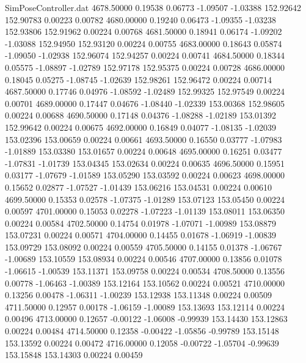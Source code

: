 \begin{filecontents}{SimPoseController.dat}
4678.50000    0.19538    0.06773    -1.09507   -1.03388  152.92642  152.90783    0.00223    0.00782
4680.00000    0.19240    0.06473    -1.09355   -1.03238  152.93806  152.91962    0.00224    0.00768
4681.50000    0.18941    0.06174    -1.09202   -1.03088  152.94950  152.93120    0.00224    0.00755
4683.00000    0.18643    0.05874    -1.09050   -1.02938  152.96074  152.94257    0.00224    0.00741
4684.50000    0.18344    0.05575    -1.08897   -1.02789  152.97178  152.95375    0.00224    0.00728
4686.00000    0.18045    0.05275    -1.08745   -1.02639  152.98261  152.96472    0.00224    0.00714
4687.50000    0.17746    0.04976    -1.08592   -1.02489  152.99325  152.97549    0.00224    0.00701
4689.00000    0.17447    0.04676    -1.08440   -1.02339  153.00368  152.98605    0.00224    0.00688
4690.50000    0.17148    0.04376    -1.08288   -1.02189  153.01392  152.99642    0.00224    0.00675
4692.00000    0.16849    0.04077    -1.08135   -1.02039  153.02396  153.00659    0.00224    0.00661
4693.50000    0.16550    0.03777    -1.07983   -1.01889  153.03380  153.01657    0.00224    0.00648
4695.00000    0.16251    0.03477    -1.07831   -1.01739  153.04345  153.02634    0.00224    0.00635
4696.50000    0.15951    0.03177    -1.07679   -1.01589  153.05290  153.03592    0.00224    0.00623
4698.00000    0.15652    0.02877    -1.07527   -1.01439  153.06216  153.04531    0.00224    0.00610
4699.50000    0.15353    0.02578    -1.07375   -1.01289  153.07123  153.05450    0.00224    0.00597
4701.00000    0.15053    0.02278    -1.07223   -1.01139  153.08011  153.06350    0.00224    0.00584
4702.50000    0.14754    0.01978    -1.07071   -1.00989  153.08879  153.07231    0.00224    0.00571
4704.00000    0.14455    0.01678    -1.06919   -1.00839  153.09729  153.08092    0.00224    0.00559
4705.50000    0.14155    0.01378    -1.06767   -1.00689  153.10559  153.08934    0.00224    0.00546
4707.00000    0.13856    0.01078    -1.06615   -1.00539  153.11371  153.09758    0.00224    0.00534
4708.50000    0.13556    0.00778    -1.06463   -1.00389  153.12164  153.10562    0.00224    0.00521
4710.00000    0.13256    0.00478    -1.06311   -1.00239  153.12938  153.11348    0.00224    0.00509
4711.50000    0.12957    0.00178    -1.06159   -1.00089  153.13693  153.12114    0.00224    0.00496
4713.00000    0.12657   -0.00122    -1.06008   -0.99939  153.14430  153.12863    0.00224    0.00484
4714.50000    0.12358   -0.00422    -1.05856   -0.99789  153.15148  153.13592    0.00224    0.00472
4716.00000    0.12058   -0.00722    -1.05704   -0.99639  153.15848  153.14303    0.00224    0.00459

\end{filecontents}

